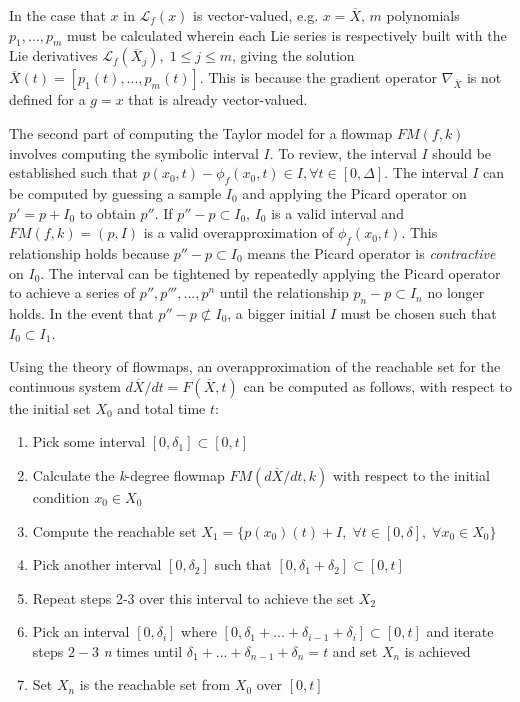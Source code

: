 In the case that $x$ in $\mathcal{L}_f (x)$ is vector-valued, e.g. $x = \overline{X}$, $m$ polynomials $p_1, ..., p_m$ must be calculated wherein each Lie series is respectively built with the Lie derivatives $\mathcal{L}_{f} (\overline{X}_j), \; 1 \leq j \leq m$, giving the solution $\overline{X}(t) = [p_1(t), ..., p_m(t)]$. This is because the gradient operator $\nabla_{\overline{X}}$ is not defined for a $g = x$ that is already vector-valued.

The second part of computing the Taylor model for a flowmap $FM(f, k)$ involves computing the symbolic interval $I$. To review, the interval $I$ should be established such that $p(x_0, t) - \phi_f(x_0, t) \in I, \forall t \in [0, \Delta]$. The interval $I$ can be computed by guessing a sample $I_0$ and applying the Picard operator on $p' = p + I_0$ to obtain $p''$. If $p'' - p \subset I_0$, $I_0$ is a valid interval and $FM(f, k) = (p, I)$ is a valid overapproximation of $\phi_f(x_0, t)$. This relationship holds because $p'' - p \subset I_0$ means the Picard operator is \textit{contractive} on $I_0$. The interval can be tightened by repeatedly applying the Picard operator to achieve a series of $p'', p''', ..., p^n$ until the relationship $p_n - p \subset I_n$ no longer holds. In the event that $p'' - p \not\subset I_0$, a bigger initial $I$ must be chosen such that $I_0 \subset I_1$. 

Using the theory of flowmaps, an overapproximation of the reachable set for the continuous system $d\overline{X} / dt = F(\overline{X}, t)$ can be computed as follows, with respect to the initial set $X_0$ and total time $t$:

\begin{enumerate}
    \item Pick some interval $[0, \delta_1] \subset [0, t]$
    \item Calculate the \textit{k}-degree flowmap $FM(d\overline{X} / dt, k)$ with respect to the initial condition $x_0 \in X_0$
    \item Compute the reachable set $X_1 = \{ p(x_0)(t) + I, \; \forall t \in [0,\delta], \; \forall x_0 \in X_0 \}$
    \item Pick another interval $[0, \delta_2]$ such that $[0, \delta_1 + \delta_2] \subset [0,t]$
    \item Repeat steps 2-3 over this interval to achieve the set $X_2$
    \item Pick an interval $[0, \delta_i]$ where $[0, \delta_1 + ... + \delta_{i-1} + \delta_{i}] \subset [0,t]$ and iterate steps $2-3$ \textit{n} times until $\delta_1 + ... + \delta_{n-1} + \delta_{n} = t$ and set $X_n$ is achieved
    \item Set $X_n$ is the reachable set from $X_0$ over $[0,t]$
\end{enumerate}


